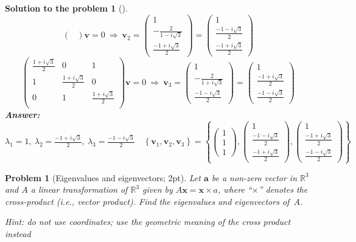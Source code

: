 \documentclass[12pt,a4]{article}
\newtheorem{problem}{Problem}
\newtheorem{solution}{Solution to the problem}
\newcommand{\bR}{{\mathbb R}}
\newcommand{\bv}{{\mathbf v}}
\newcommand{\bx}{{\mathbf x}}
\newcommand{\answer}[1]{\textbf{Answer:} #1}
\begin{document}
{\begin{solution}[]
\[\begin{pmatrix}
\end{pmatrix}
\bv = 0
~\Rightarrow~
\bv_2 = 
\begin{pmatrix}
1 \\
-\frac2{1 - i\sqrt3} \\
\frac{- 1 + i\sqrt3}2
\end{pmatrix}
=
\begin{pmatrix}
1 \\
\frac{- 1 - i\sqrt3}2 \\
\frac{- 1 + i\sqrt3}2
\end{pmatrix}
\]
\[
\begin{pmatrix}
\frac{1 + i\sqrt3}2 & 0 & 1 \\
1 & \frac{1 + i\sqrt3}2 & 0 \\
0 & 1 & \frac{1 + i\sqrt3}2 \\
\end{pmatrix}
\bv = 0
~\Rightarrow~
\bv_3 = 
\begin{pmatrix}
1 \\
-\frac2{1 + i\sqrt3} \\
\frac{- 1 - i\sqrt3}2
\end{pmatrix}
=
\begin{pmatrix}
1 \\
\frac{- 1 + i\sqrt3}2 \\
\frac{- 1 - i\sqrt3}2
\end{pmatrix}
\]
\answer{
$
\lambda_1 = 1, ~
\lambda_2 = \frac{-1 + i\sqrt3}2, ~
\lambda_3 = \frac{-1 - i\sqrt3}2
\quad
\left \{\bv_1, \bv_2, \bv_3 \right \} 
=
\left \{
\begin{pmatrix}
1 \\ 1 \\ 1
\end{pmatrix},
\begin{pmatrix}
1 \\
\frac{- 1 - i\sqrt3}2 \\
\frac{- 1 + i\sqrt3}2
\end{pmatrix},
\begin{pmatrix}
1 \\
\frac{- 1 + i\sqrt3}2 \\
\frac{- 1 - i\sqrt3}2
\end{pmatrix} \right \}
$
}
\end{solution}
}

\begin{problem}[Eigenvalues and eigenvectors; 2pt]\rm 
	Let $\mathbf{a}$ be a non-zero vector in $\bR^3$ and $A$ a linear transformation of $\mathbb{R}^3$ given by $A\bx = \bx \times a$, where ``$\times$'' denotes the cross-product (i.e., vector product). Find the eigenvalues and eigenvectors of~$A$.
	
		{\small{\textsf{Hint: do not use coordinates; use the geometric meaning of the cross product instead}}}
\end{problem}
\end{document}
